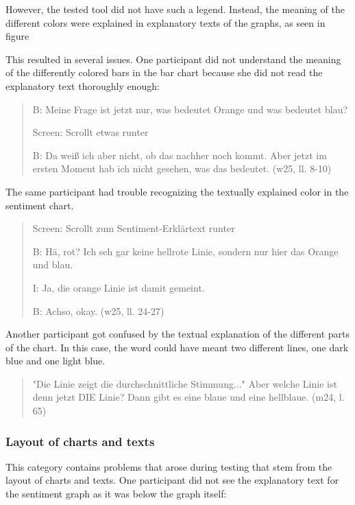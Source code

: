 However, the tested tool did not have such a legend. Instead, the meaning of the different colors were explained in explanatory texts of the graphs, as seen in figure %


This resulted in several issues. One participant did not understand the meaning of the differently colored bars in the bar chart because she did not read the explanatory text thoroughly enough:

\begin{quote}
    B: Meine Frage ist jetzt nur, was bedeutet Orange und was bedeutet blau? 

    Screen: Scrollt etwas runter

    B: Da weiß ich aber nicht, ob das nachher noch kommt. Aber jetzt im ersten Moment hab ich nicht gesehen, was das bedeutet. (w25, ll. 8-10)
\end{quote}

The same participant had trouble recognizing the textually explained color in the sentiment chart.

\begin{quote}
    Screen: Scrollt zum Sentiment-Erklärtext runter

    B: Hä, rot? Ich seh gar keine hellrote Linie, sondern nur hier das Orange und blau.

    I: Ja, die orange Linie ist damit gemeint.

    B: Achso, okay. (w25, ll. 24-27)
\end{quote}

Another participant got confused by the textual explanation of the different parts of the chart. In this case, the word  could have meant two different lines, one dark blue and one light blue.

\begin{quote}
    "Die Linie zeigt die durchschnittliche Stimmung..." Aber welche Linie ist denn jetzt DIE Linie? Dann gibt es eine blaue und eine hellblaue. (m24, l. 65)
\end{quote}

\subsubsection*{Layout of charts and texts}
This category contains problems that arose during testing that stem from the layout of charts and texts. One participant did not see the explanatory text for the sentiment graph as it was below the graph itself:

